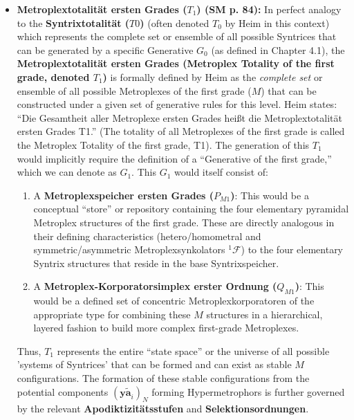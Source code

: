 \documentclass[12pt]{article}
\newcommand{\q}[1]{\enquote{#1}}
\newcommand{\syntrix}{\bm{y\widetilde{a}}}
\newcommand{\syntrixtotalitaet}{T0}
\newcommand{\generative}{G}
\def\metroplex#1#2{M}%
\newcommand{\hypersyntrix}{\metroplex{1}{F}}
\newcommand{\metroplexsynkolator}[1]{{}^{#1}\mathcal{F}}
\newcommand{\metroplextotalitaet}[1]{T_{#1}}
\begin{document}
\begin{itemize}
    \item \textbf{Metroplextotalität ersten Grades (\( \metroplextotalitaet{1} \)) (SM p. 84):}
    In perfect analogy to the \textbf{Syntrixtotalität (\( \syntrixtotalitaet \))} (often denoted \(T_0\) by Heim in this context) which represents the complete set or ensemble of all possible Syntrices that can be generated by a specific Generative \( \generative_0 \) (as defined in Chapter 4.1), the \textbf{Metroplextotalität ersten Grades (Metroplex Totality of the first grade, denoted \( \metroplextotalitaet{1} \))} is formally defined by Heim as the \textit{complete set} or ensemble of all possible Metroplexes of the first grade (\( \hypersyntrix \)) that can be constructed under a given set of generative rules for this level. Heim states: \q{Die Gesamtheit aller Metroplexe ersten Grades heißt die Metroplextotalität ersten Grades T1.} (The totality of all Metroplexes of the first grade is called the Metroplex Totality of the first grade, T1).
    The generation of this \( \metroplextotalitaet{1} \) would implicitly require the definition of a \q{Generative of the first grade,} which we can denote as \( \generative_1 \). This \( \generative_1 \) would itself consist of:
    \begin{enumerate}
        \item A \textbf{Metroplexspeicher ersten Grades (\( P_{M1} \))}: This would be a conceptual \q{store} or repository containing the four elementary pyramidal Metroplex structures of the first grade. These are directly analogous in their defining characteristics (hetero/homometral and symmetric/asymmetric Metroplexsynkolators \( \metroplexsynkolator{1} \)) to the four elementary Syntrix structures that reside in the base Syntrixspeicher.
        \item A \textbf{Metroplex-Korporatorsimplex erster Ordnung (\( Q_{M1} \))}: This would be a defined set of concentric Metroplexkorporatoren of the appropriate type for combining these \( \hypersyntrix \) structures in a hierarchical, layered fashion to build more complex first-grade Metroplexes.
    \end{enumerate}
    Thus, \( \metroplextotalitaet{1} \) represents the entire \q{state space} or the universe of all possible 'systems of Syntrices' that can be formed and can exist as stable \( \hypersyntrix \) configurations. The formation of these stable configurations from the potential components \( (\syntrix_i)_N \) forming Hypermetrophors is further governed by the relevant \textbf{Apodiktizitätsstufen} and \textbf{Selektionsordnungen}.


\end{itemize}
\end{document}
